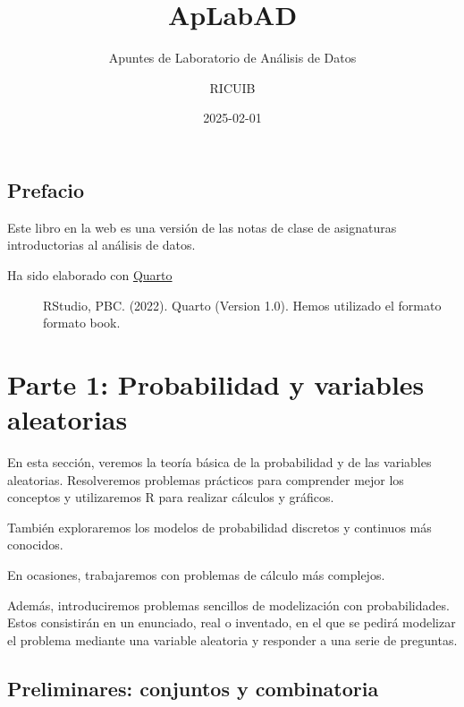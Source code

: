 \documentclass[
  letterpaper,
  DIV=11,
  numbers=noendperiod]{scrreprt}
\title{ApLabAD}
\subtitle{Apuntes de Laboratorio de Análisis de Datos}
\author{RICUIB}
\date{2025-02-01}
\renewcommand*\contentsname{Tabla de contenidos}
\newcommand\contentsname{Tabla de contenidos}
\begin{document}
\maketitle

\renewcommand*\contentsname{Tabla de contenidos}
{
\hypersetup{linkcolor=}
\setcounter{tocdepth}{2}
\tableofcontents
}


\chapter*{Prefacio}\label{prefacio}


Este libro en la web es una versión de las notas de clase de asignaturas
introductorias al análisis de datos.

\begin{description}
\item[Ha sido elaborado con \href{https://quarto.org/}{Quarto}]
RStudio, PBC. (2022). Quarto (Version 1.0). Hemos utilizado el formato
formato book.
\end{description}

\part{Parte 1: Probabilidad y variables aleatorias}

En esta sección, veremos la teoría básica de la probabilidad y de las
variables aleatorias. Resolveremos problemas prácticos para comprender
mejor los conceptos y utilizaremos R para realizar cálculos y gráficos.

También exploraremos los modelos de probabilidad discretos y continuos
más conocidos.

En ocasiones, trabajaremos con problemas de cálculo más complejos.

Además, introduciremos problemas sencillos de modelización con
probabilidades. Estos consistirán en un enunciado, real o inventado, en
el que se pedirá modelizar el problema mediante una variable aleatoria y
responder a una serie de preguntas.

\chapter{Preliminares: conjuntos y
combinatoria}\label{preliminares-conjuntos-y-combinatoria}
\end{document}
